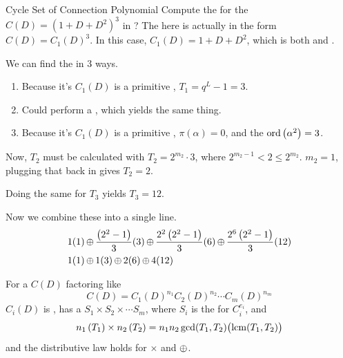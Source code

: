 \begin{example}{Cycle Set of Connection Polynomial}
  Compute the  for the  $C(D) = {\left( 1+D+D^{2} \right)}^{3}$ in ?
  \tcblower{}
  The  here is actually in the form $C(D) = {C_{1}(D)}^{3}$.
  In this case, $C_{1}(D) = 1+D+D^{2}$, which is both  and .

  We can find the  in 3 ways.
  \begin{enumerate}[noitemsep]
  \item Because it's $C_{1}(D)$ is a primitive , $T_{1}=q^{L}-1 = 3$.
  \item Could perform a , which yields the same thing.
  \item Because it's $C_{1}(D)$ is a primitive , $\pi(\alpha)=0$, and the $\operatorname{\operatorname{ord}} \left( \alpha^{2} \right) = 3$.
  \end{enumerate}

  Now, $T_{2}$ must be calculated with $T_{2} = 2^{m_{2}} \cdot 3$, where $2^{m_{2}-1} < 2 \leq 2^{m_{2}}$.
  $m_{2} = 1$, plugging that back in gives $T_{2} = 2$.

  Doing the same for $T_{3}$ yields $T_{3} = 12$.

  Now we combine these into a single line.
  \begin{align*}
    1(1) &\operatorname{\oplus} \frac{ \left( 2^{2} - 1 \right)}{3} (3) \operatorname{\oplus} \frac{ 2^{2} \left( 2^{2} - 1 \right)}{3} (6) \operatorname{\oplus} \frac{2^{6} \left( 2^{2} - 1 \right)}{3} (12) \\
    1(1) &\operatorname{\oplus} 1 (3) \operatorname{\oplus} 2 (6) \operatorname{\oplus} 4 (12)
  \end{align*}
\end{example}

\begin{theorem}\label{thm:Arbitrary_Connection_Polynomial}
  For a  $C(D)$ factoring like
  \begin{equation*}
    C(D) = {C_{1}(D)}^{n_{1}} {C_{2}(D)}^{n_{2}} \cdots {C_{m}(D)}^{n_{m}}
  \end{equation*}
  $C_{i}(D)$ is , has a  $S_{1} \times S_{2} \times \cdots S_{m}$, where $S_{i}$ is the  for $C_{i}^{e_{i}}$, and
  \begin{equation}\label{eq:Arbitrary_Connection_Polynomial}
    n_{1} \left( T_{1} \right) \times n_{2} \left( T_{2} \right) = n_{1}n_{2} \gcd(T_{1}, T_{2}) \bigl( \operatorname{\operatorname{lcm}}(T_{1}, T_{2}) \bigr)
  \end{equation}
  and the distributive law holds for $\times$ and $\operatorname{\oplus}$.
\end{theorem}

